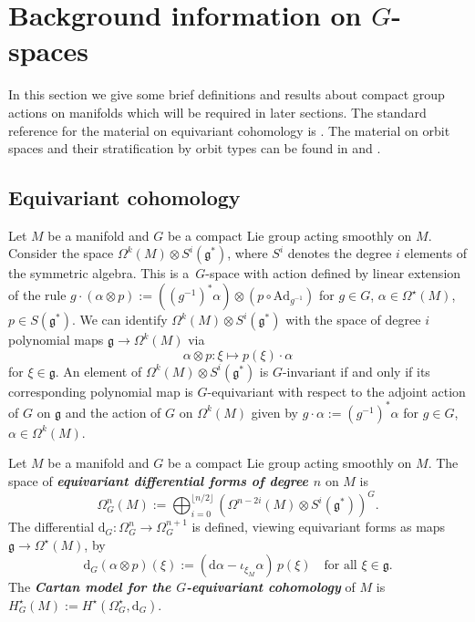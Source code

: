 \documentclass[11pt]{article}
\numberwithin{equation}{section}
\newcommand{\deff}[1]{\textbf{\emph{#1}}}
\newcommand{\func}[3]{#1 \colon #2 \to #3}
\begin{document}
\section{Background information on $G$-spaces}\label{section2}

In this section we give some brief def\/initions and results about compact group actions on manifolds which will be required in later sections.  The standard reference for the material on equivariant cohomology is \cite{supersymmetry}.  The material on orbit spaces and their stratif\/ication by orbit types can be found in \cite[Chapter 2]{duis} and \cite[Chapter 2]{ortega-ratiu}.


\subsection{Equivariant cohomology}


Let $M$ be a manifold and $G$ be a compact Lie group acting smoothly on $M$.  Consider the space $\Omega^{k}(M) \otimes S^i(\mathfrak{g}^*)$, where $S^i$ denotes the degree $i$ elements of the symmetric algebra.  This is a~$G$-space with action def\/ined by linear extension of the rule $g \cdot (\alpha \otimes p) := \left( (g^{-1})^* \alpha \right) \otimes (p \circ \mathrm{Ad}_{g^{-1}})$ for $g \in G$, $\alpha \in \Omega^{\star}(M)$, $p \in S(\mathfrak{g}^*)$.  We can identify $\Omega^{k}(M) \otimes S^i(\mathfrak{g}^*)$ with the space of degree $i$ polynomial maps $\mathfrak{g} \to \Omega^k(M)$ via
\[
  \alpha \otimes p \colon \xi \mapsto p(\xi) \cdot \alpha
\]
for $\xi \in \mathfrak{g}$.  An element of $\Omega^{k}(M) \otimes S^i(\mathfrak{g}^*)$ is $G$-invariant if and only if its corresponding polynomial map is $G$-equivariant with respect to the adjoint action of $G$ on $\mathfrak{g}$ and the action of $G$ on $\Omega^k(M)$ given by $g \cdot \alpha := (g^{-1})^* \alpha$ for $g \in G$, $\alpha \in \Omega^k(M)$.


\begin{Definition}
Let $M$ be a manifold and $G$ be a compact Lie group acting smoothly on $M$.  The space of \deff{equivariant differential forms of degree $n$} on $M$ is
\[
  \Omega_G^n(M) := \bigoplus_{i=0}^{\lfloor n/2 \rfloor}
  \left( \Omega^{n-2i}(M) \otimes S^i(\mathfrak{g}^*) \right)^G.
\]
The dif\/ferential $\func{\mathrm{d}_G}{\Omega_G^n}{\Omega_G^{n+1}}$ is def\/ined, viewing equivariant forms as maps $\mathfrak{g} \to \Omega^{\star}(M)$, by
\[
  \mathrm{d}_G ( \alpha \otimes p )(\xi)
  :=
  \left( \mathrm{d} \alpha - \iota_{\xi_M} \alpha \right) \, p(\xi)
  \quad \text{for all } \xi \in \mathfrak{g}.
\]
The \deff{Cartan model for the $G$-equivariant cohomology} of $M$ is $H_G^{\star}(M) := H^{\star} (\Omega_G^{\star}, \mathrm{d}_G)$.
\end{Definition}
\end{document}

